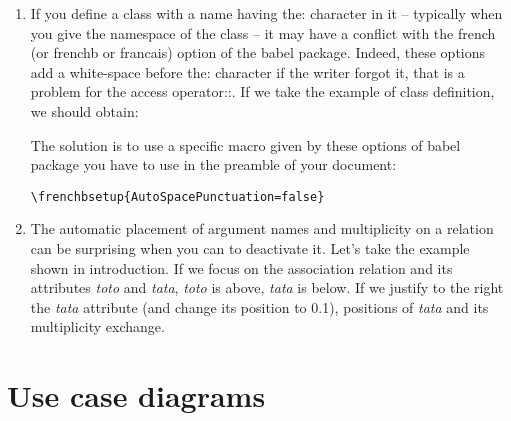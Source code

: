 \documentclass[a4paper,11pt]{report}
\begin{document}
\begin{enumerate}
\medskip

\item If you define a class with a name having the: character in it -- typically when you give the namespace of the class -- it may have a conflict with the french (or frenchb or francais) option of the babel package. Indeed, these options add a white-space before the: character if the writer forgot it, that is a problem for the access operator::. If we take the example of class definition, we should obtain:

\medskip

\begin{minipage}{0.6\textwidth}

\end{minipage}
\begin{minipage}{0.4\textwidth}
\begin{center}
\end{center}
\end{minipage}

\medskip

The solution is to use a specific macro given by these options of babel package you have to use in the preamble of your document:

\medskip

\begin{lstlisting}
\frenchbsetup{AutoSpacePunctuation=false}
\end{lstlisting}

\medskip

\item The automatic placement of argument names and multiplicity on a relation can be surprising when you can to deactivate it. Let's take the example shown in introduction. If we focus on the association relation and its attributes {\it toto} and {\it tata}, {\it toto} is above, {\it tata} is below. 
If we justify to the right the {\it tata} attribute (and change its position to 0.1), positions of {\it tata} and its multiplicity exchange.

\begin{center}
\end{center}

\end{enumerate}

\chapter{Use case diagrams}\label{c.usecase}
\end{document}

